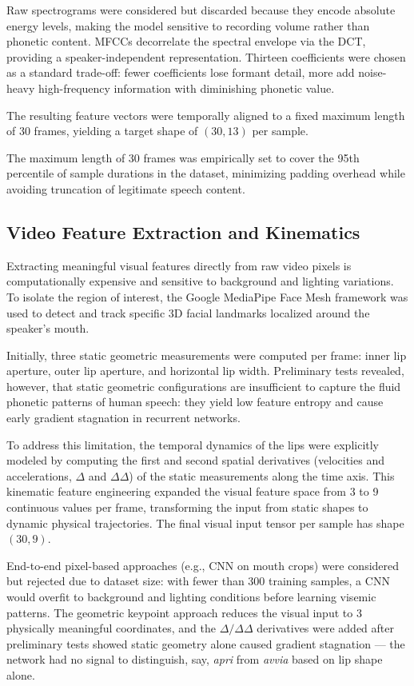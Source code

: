 \documentclass[sigconf,screen,nonacm]{acmart}
\begin{document}
Raw spectrograms were considered but discarded because they encode absolute energy levels, making the model sensitive to recording volume rather than phonetic content. MFCCs decorrelate the spectral envelope via the DCT, providing a speaker-independent representation. Thirteen coefficients were chosen as a standard trade-off: fewer coefficients lose formant detail, more add noise-heavy high-frequency information with diminishing phonetic value.

The resulting feature vectors were temporally aligned to a fixed maximum length of 30 frames, yielding a target shape of $(30, 13)$ per sample.

The maximum length of 30 frames was empirically set to cover the 95th percentile of sample durations in the dataset, minimizing padding overhead while avoiding truncation of legitimate speech content.

\subsection{Video Feature Extraction and Kinematics}
Extracting meaningful visual features directly from raw video pixels is computationally expensive and sensitive to background and lighting variations. To isolate the region of interest, the Google MediaPipe Face Mesh framework was used to detect and track specific 3D facial landmarks localized around the speaker's mouth.

Initially, three static geometric measurements were computed per frame: inner lip aperture, outer lip aperture, and horizontal lip width. Preliminary tests revealed, however, that static geometric configurations are insufficient to capture the fluid phonetic patterns of human speech: they yield low feature entropy and cause early gradient stagnation in recurrent networks.

To address this limitation, the temporal dynamics of the lips were explicitly modeled by computing the first and second spatial derivatives (velocities and accelerations, $\Delta$ and $\Delta\Delta$) of the static measurements along the time axis. This kinematic feature engineering expanded the visual feature space from 3 to 9 continuous values per frame, transforming the input from static shapes to dynamic physical trajectories. The final visual input tensor per sample has shape $(30, 9)$.

End-to-end pixel-based approaches (e.g., CNN on mouth crops) were considered but rejected due to dataset size: with fewer than 300 training samples, a CNN would overfit to background and lighting conditions before learning visemic patterns. The geometric keypoint approach reduces the visual input to 3 physically meaningful coordinates, and the $\Delta/\Delta\Delta$ derivatives were added after preliminary tests showed static geometry alone caused gradient stagnation --- the network had no signal to distinguish, say, \textit{apri} from \textit{avvia} based on lip shape alone.
\end{document}
